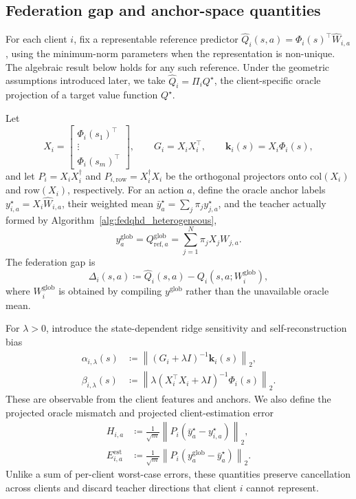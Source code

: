\documentclass[sigconf,anonymous]{aamas}
\theoremstyle{plain}
\theoremstyle{definition}
\theoremstyle{remark}
\newcommand{\defeq}{\coloneqq}
\begin{document}
\subsection{Federation gap and anchor-space quantities}
\label{subsec:fed_gap}

For each client $i$, fix a representable reference predictor
$\hat Q_i(s,a)=\Phi_i(s)^\top\hat W_{i,a}$, using the minimum-norm
parameters when the representation is non-unique.  The algebraic result
below holds for any such reference.  Under the geometric assumptions
introduced later, we take $\hat Q_i=\Pi_iQ^\star$, the client-specific
oracle projection of a target value function $Q^\star$.

Let
\[
X_i=\begin{bmatrix}
\Phi_i(s_1)^\top\\[-1mm]\vdots\\[-1mm]\Phi_i(s_m)^\top
\end{bmatrix},\qquad
G_i=X_iX_i^\top,\qquad
\mathbf k_i(s)=X_i\Phi_i(s),
\]
and let $P_i=X_iX_i^\dagger$ and
$P_{i,\mathrm{row}}=X_i^\dagger X_i$ be the orthogonal projectors onto
$\mathrm{col}(X_i)$ and $\mathrm{row}(X_i)$, respectively.  For an action
$a$, define the oracle anchor labels
$y^\star_{i,a}=X_i\hat W_{i,a}$, their weighted mean
$\bar y^\star_a=\sum_j\pi_j y^\star_{j,a}$, and the teacher actually
formed by Algorithm~\ref{alg:fedqhd_heterogeneous},
\[
y^{\mathrm{glob}}_a
=Q^{\mathrm{glob}}_{\mathrm{ref},a}
=\sum_{j=1}^N\pi_jX_jW_{j,a}.
\]
The federation gap is
\begin{equation}
\Delta_i(s,a)
\defeq
\hat Q_i(s,a)-Q_i(s,a;W_i^{\mathrm{glob}}),
\label{eq:gap_def}
\end{equation}
where $W_i^{\mathrm{glob}}$ is obtained by compiling
$y^{\mathrm{glob}}$ rather than the unavailable oracle mean.

For $\lambda>0$, introduce the state-dependent ridge sensitivity and
self-reconstruction bias
\begin{align}
\alpha_{i,\lambda}(s)
&\defeq
\left\|(G_i+\lambda I)^{-1}\mathbf k_i(s)\right\|_2,
\label{eq:alpha_def}\\
\beta_{i,\lambda}(s)
&\defeq
\left\|\lambda(X_i^\top X_i+\lambda I)^{-1}\Phi_i(s)\right\|_2.
\label{eq:beta_def}
\end{align}
These are observable from the client features and anchors.  We also
define the projected oracle mismatch and projected client-estimation
error
\begin{align}
H_{i,a}
&\defeq
\frac{1}{\sqrt m}
\left\|P_i(\bar y^\star_a-y^\star_{i,a})\right\|_2,
\label{eq:H_def}\\
E_{i,a}^{\mathrm{est}}
&\defeq
\frac{1}{\sqrt m}
\left\|P_i(y^{\mathrm{glob}}_a-\bar y^\star_a)\right\|_2.
\label{eq:E_def}
\end{align}
Unlike a sum of per-client worst-case errors, these quantities preserve
cancellation across clients and discard teacher directions that client
$i$ cannot represent.
\end{document}

